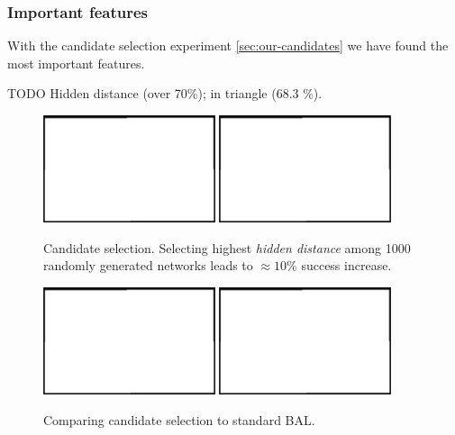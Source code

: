 
\subsubsection{Important features}
\label{sec:results-candidates} 

With the candidate selection experiment \ref{sec:our-candidates} we have found the most important features. 

TODO Hidden distance (over 70\%); in triangle (68.3 \%). \\


\begin{figure}[H]
  \centering
  \includegraphics[width=0.45\textwidth]{img/placeholder.png}  %
  \includegraphics[width=0.45\textwidth]{img/placeholder.png}  %
  \caption{Candidate selection. Selecting highest \emph{hidden distance} among 1000 randomly generated networks leads to $\approx 10\%$ success increase.}
  \label{fig:results-candidates-tlr}
\end{figure}


\begin{figure}[H]
  \centering
  \includegraphics[width=0.45\textwidth]{img/placeholder.png}  %
  \includegraphics[width=0.45\textwidth]{img/placeholder.png}  %
  \caption{Comparing candidate selection to standard BAL.}
  \label{fig:results-candidates-epoch}
\end{figure}

